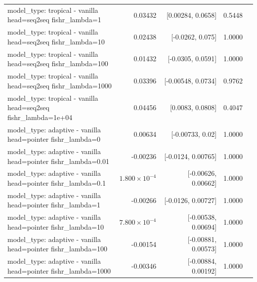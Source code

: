\documentclass[10pt]{article}
\makeatletter
\newcommand{\stackcell}[1]{\begin{tabular}[t]{@{}l@{}}#1\end{tabular}}
\makeatother
\begin{document}
{\begin{longtable}{lrrrl}
\stackcell{model\_type: tropical - vanilla\\\footnotesize head=seq2seq fishr\_lambda=1 } & 0.03432 & [0.00284, 0.0658] & 0.5448 & \\
\stackcell{model\_type: tropical - vanilla\\\footnotesize head=seq2seq fishr\_lambda=10 } & 0.02438 & [-0.0262, 0.075] & 1.0000 & \\
\stackcell{model\_type: tropical - vanilla\\\footnotesize head=seq2seq fishr\_lambda=100 } & 0.01432 & [-0.0305, 0.0591] & 1.0000 & \\
\stackcell{model\_type: tropical - vanilla\\\footnotesize head=seq2seq fishr\_lambda=1000 } & 0.03396 & [-0.00548, 0.0734] & 0.9762 & \\
\stackcell{model\_type: tropical - vanilla\\\footnotesize head=seq2seq fishr\_lambda=1e+04 } & 0.04456 & [0.0083, 0.0808] & 0.4047 & \\
\stackcell{model\_type: adaptive - vanilla\\\footnotesize head=pointer fishr\_lambda=0 } & 0.00634 & [-0.00733, 0.02] & 1.0000 & \\
\stackcell{model\_type: adaptive - vanilla\\\footnotesize head=pointer fishr\_lambda=0.01 } & -0.00236 & [-0.0124, 0.00765] & 1.0000 & \\
\stackcell{model\_type: adaptive - vanilla\\\footnotesize head=pointer fishr\_lambda=0.1 } & $1.800\times10^{-4}$ & [-0.00626, 0.00662] & 1.0000 & \\
\stackcell{model\_type: adaptive - vanilla\\\footnotesize head=pointer fishr\_lambda=1 } & -0.00266 & [-0.0126, 0.00727] & 1.0000 & \\
\stackcell{model\_type: adaptive - vanilla\\\footnotesize head=pointer fishr\_lambda=10 } & $7.800\times10^{-4}$ & [-0.00538, 0.00694] & 1.0000 & \\
\stackcell{model\_type: adaptive - vanilla\\\footnotesize head=pointer fishr\_lambda=100 } & -0.00154 & [-0.00881, 0.00573] & 1.0000 & \\
\stackcell{model\_type: adaptive - vanilla\\\footnotesize head=pointer fishr\_lambda=1000 } & -0.00346 & [-0.00884, 0.00192] & 1.0000 & \\

\end{longtable}}
\end{document}
